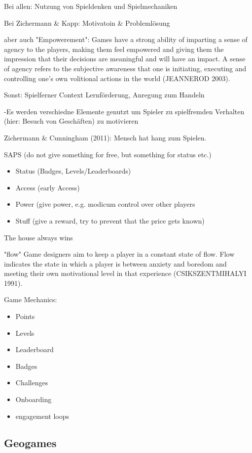 Bei allen:
Nutzung von Spieldenken und Spielmechaniken

Bei Zichermann \& Kapp:
Motivatoin \& Problemlösung

aber auch "Empowerement":
Games have a strong ability of imparting a sense of agency to the players, making them feel
empowered and giving them the impression that their decisions are meaningful and will
have an impact. A sense of agency refers to the subjective awareness that one is initiating,
executing and controlling one’s own volitional actions in the world (JEANNEROD 2003).

Sonst:
Spielferner Context
Lernförderung, Anregung zum Handeln

-Es werden verschiedne Elemente genutzt um Spieler zu spielfremden Verhalten (hier: Besuch von Geschäften) zu motivieren


Zichermann \& Cunningham (2011):
Mensch hat hang zum Spielen.

SAPS (do not give something for free, but something for status etc.)

\begin{itemize}
      \item Status (Badges, Levels/Leaderboards)
      \item Access (early Access)
      \item Power (give power, e.g. modicum control over other players
      \item Stuff (give a reward, try to prevent that the price gets known)
\end{itemize}

The house always wins

"flow"
Game designers aim to
keep a player in a constant state of flow. Flow indicates the state in which a player is between
anxiety and boredom and meeting their own motivational level in that experience
(CSIKSZENTMIHALYI 1991).

Game Mechanics:
\begin{itemize}
      \item Points
      \item Levels
      \item Leaderboard
      \item Badges
      \item Challenges
      \item Onboarding
      \item engagement loops
\end{itemize}

\subsection{Geogames}

